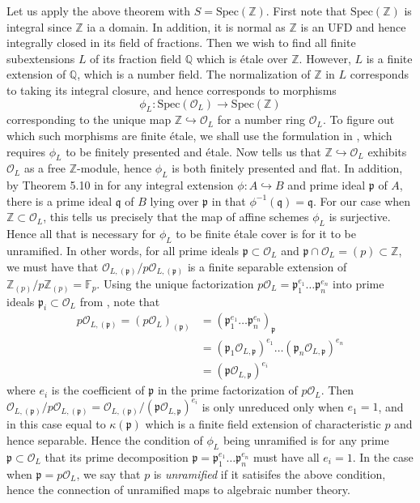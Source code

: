 \documentclass{article}
\theoremstyle{definition}
\theoremstyle{remark}
\theoremstyle{plain}
\newcommand{\Z}{\mathbb{Z}}
\newcommand{\Q}{\mathbb{Q}}
\newcommand{\mc}[1]{\mathcal{#1}}
\newcommand{\mk}[1]{\mathfrak{#1}}
\newcommand{\ic}{\cap}
\begin{document}
Let us apply the above theorem with $S = \text{Spec}(\Z)$.
First note that $\text{Spec}(\Z)$ is integral since $\Z$ ia a domain.
In addition, it is normal as $\Z$ is an UFD and hence integrally closed in its field of fractions.
Then we wish to find all finite subextensions $L$ of its fraction field $\Q$ which is \'etale over $\Z$.
However, $L$ is a finite extension of $\Q$, which is a number field.
The normalization of $\Z$ in $L$ corresponds to taking its integral closure, and hence corresponds to morphisms
\[\phi_L: \text{Spec}(\mc{O}_L) \to \text{Spec}(\Z)\]
corresponding to the unique map $\Z \hookrightarrow \mc{O}_L$ for a number ring $\mc{O}_L$.
To figure out which such morphisms are finite \'etale, we shall use the formulation in , which requires $\phi_L$ to be finitely presented and \'etale.
Now  tells us that $\Z \hookrightarrow \mc{O}_L$ exhibits $\mc{O}_L$ as a free $\Z$-module, hence $\phi_L$ is both finitely presented and flat.
In addition, by Theorem 5.10 in \cite{atiyah} for any integral extension $\phi: A \hookrightarrow B$ and prime ideal $\mk{p}$ of $A$, there is a prime ideal $\mk{q}$ of $B$ lying over $\mk{p}$ in that $\phi^{-1}(\mk{q}) = \mk{q}$.
For our case when $\Z \subset \mc{O}_L$, this tells us precisely that the map of affine schemes $\phi_L$ is surjective.
Hence all that is necessary for $\phi_L$ to be finite \'etale cover is for it to be unramified.
In other words, for all prime ideals $\mk{p} \subset \mc{O}_L$  and $\mk{p} \ic \mc{O}_L = (p) \subset \Z$, we must have that $\mc{O}_{L, (\mk{p})}/ p \mc{O}_{L, (\mk{p})}$ is a finite separable extension of $\Z_{(p)}/p \Z_{(p)} = \mathbb{F}_p$.
Using the unique factorization $p\mc{O}_L = \mk{p}_1^{e_1} \dots \mk{p}_n^{e_n}$ into prime ideals $\mk{p}_i \subset \mc{O}_L$ from , note that 
\begin{align*}
	p \mc{O}_{L, (\mk{p})} = (p \mc{O}_L)_{(\mk{p})} &= (\mk{p}_1^{e_1} \dots \mk{p}_n^{e_n})_{\mk{p}}\\
													 &= (\mk{p}_1 \mc{O}_{L, \mk{p}})^{e_1}\dots (\mk{p}_n \mc{O}_{L, \mk{p}})^{e_n}\\
													 &= (\mk{p} \mc{O}_{L, \mk{p}})^{e_i}
\end{align*}
where $e_i$ is the coefficient of $\mk{p}$ in the prime factorization of $p \mc{O}_L$.
Then $\mc{O}_{L, (\mk{p})}/p \mc{O}_{L, (\mk{p})} = \mc{O}_{L, (\mk{p})}/(\mk{p} \mc{O}_{L, \mk{p}})^{e_i}$
is only unreduced only when $e_1 = 1$, and in this case equal to $\kappa(\mk{p})$  which is a finite field extension of characteristic $p$ and hence separable.
Hence the condition of $\phi_L$ being unramified is for any prime $\mk{p} \subset \mc{O}_L$ that its prime decomposition $\mk{p} =  \mk{p}_1^{e_1} \dots \mk{p}_n^{e_n}$ must have all $e_i = 1$.
In the case when $\mk{p} = p\mc{O}_L$, we say that $p$ is  \textit{unramified} if it satisifes the above condition, hence the connection of unramified maps to algebraic number theory.\\
\end{document}
